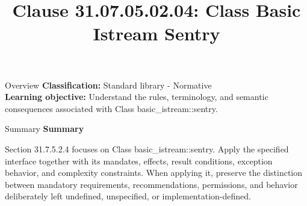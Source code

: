 \documentclass[10pt,letterpaper]{article}
\title{Clause 31.07.05.02.04: Class Basic Istream Sentry}
\author{}
\date{}
\begin{document}
\maketitle
\begin{CornellOverviewBox}{Overview}
\textbf{Classification:} Standard library - Normative\\[2pt]
\textbf{Learning objective:} Understand the rules, terminology, and semantic consequences associated with Class basic\_istream::sentry.
\end{CornellOverviewBox}\begin{CornellSummaryBox}{Summary}
{\sffamily\bfseries\color{Accent} Summary}\par\vspace{3pt}Section 31.7.5.2.4 focuses on Class basic\_istream::sentry. Apply the specified interface together with its mandates, effects, result conditions, exception behavior, and complexity constraints. When applying it, preserve the distinction between mandatory requirements, recommendations, permissions, and behavior deliberately left undefined, unspecified, or implementation-defined.
\end{CornellSummaryBox}
\end{document}
